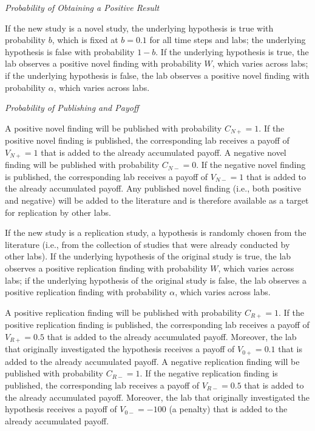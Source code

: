\documentclass[meta, authordate]{jote-new-article}
\begin{document}
\begin{adjustwidth}{-4cm}{}
\begin{tcolorbox}
{      \vspace*{\baselineskip}
      \noindent\emph{Probability of Obtaining a Positive Result}
      \vspace*{\baselineskip}

      \noindent If the new study is a novel study, the underlying hypothesis is true with probability $b$, which is fixed at $b=0.1$ for all time steps and labs; the underlying hypothesis is false with probability $1-b$. If the underlying hypothesis is true, the lab observes a positive novel finding with probability $W$, which varies across labs; if the underlying hypothesis is false, the lab observes a positive novel finding with probability $\alpha$, which varies across labs.

      \vspace*{\baselineskip}
      \noindent\emph{Probability of Publishing and Payoff}
      \vspace*{\baselineskip}

      \noindent A positive novel finding will be published with probability $C_{N+}=1$. If the positive novel finding is published, the corresponding lab receives a payoff of $V_{N+}=1$ that is added to the already accumulated payoff. A negative novel finding will be published with probability $C_{N-}=0$. If the negative novel finding is published, the corresponding lab receives a payoff of $V_{N-}=1$ that is added to the already accumulated payoff. Any published novel finding (i.e., both positive and negative) will be added to the literature and is therefore available as a target for replication by other labs.

      If the new study is a replication study, a hypothesis is randomly chosen from the literature (i.e., from the collection of studies that were already conducted by other labs). If the underlying hypothesis of the original study is true, the lab observes a positive replication finding with probability $W$, which varies across labs; if the underlying hypothesis of the original study is false, the lab observes a positive replication finding with probability $\alpha$, which varies across labs.

      A positive replication finding will be published with probability $C_{R+}=1$. If the positive replication finding is published, the corresponding lab receives a payoff of $V_{R+}=0.5$ that is added to the already accumulated payoff. Moreover, the lab that originally investigated the hypothesis receives a payoff of $V_{0+}=0.1$ that is added to the already accumulated payoff. A negative replication finding will be published with probability $C_{R-}=1$. If the negative replication finding is published, the corresponding lab receives a payoff of $V_{R-}=0.5$ that is added to the already accumulated payoff. Moreover, the lab that originally investigated the hypothesis receives a payoff of $V_{0-}=-100$ (a penalty) that is added to the already accumulated payoff.

}
\end{tcolorbox}
\end{adjustwidth}
\end{document}
